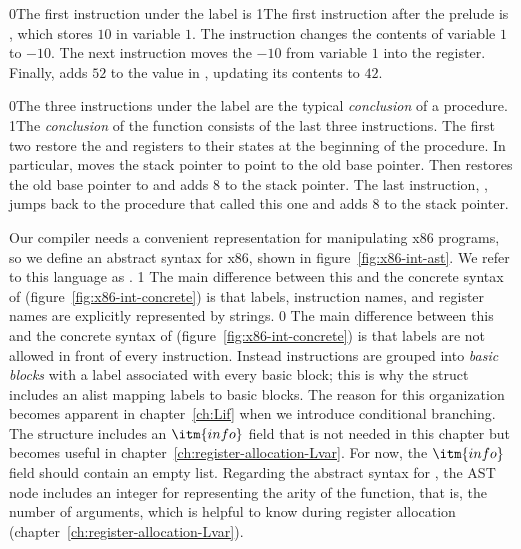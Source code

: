 \documentclass[7x10]{TimesAPriori_MIT}%
\def\racketEd{0}
\def\pythonEd{1}
\providecommand{\BookEdition}{1}
\let\edition\BookEdition
\newcommand{\racket}[1]{{\if\edition\racketEd{#1}\fi}}
\newcommand{\pythonColor}[0]{}
\newcommand{\python}[1]{{\if\edition\pythonEd\pythonColor #1\fi}}
\numberwithin{theorem}{chapter}
\numberwithin{definition}{chapter}
\numberwithin{equation}{chapter}
\begin{document}
\racket{The first instruction under the  label is}
%
\python{The first instruction after the prelude is}
%
, which stores $10$ in variable $1$.
%
The instruction  changes the contents of variable
$1$ to $-10$.
%
The next instruction moves the $-10$ from variable $1$ into the
 register.  Finally,  adds $52$ to
the value in , updating its contents to $42$.

\racket{The three instructions under the label  are the
  typical \emph{conclusion} of a procedure.}
%
\python{The \emph{conclusion}\index{subject}{conclusion} of the
  \code{main} function consists of the last three instructions.}
%
The first two restore the  and  registers to their
states at the beginning of the procedure. In particular,
 moves the stack pointer to point to the
old base pointer. Then  restores the old base pointer
to  and adds $8$ to the stack pointer.  The last instruction,
, jumps back to the procedure that called this one and adds
$8$ to the stack pointer.

Our compiler needs a convenient representation for manipulating x86
programs, so we define an abstract syntax for x86, shown in
figure~\ref{fig:x86-int-ast}. We refer to this language as
\LangXInt{}.
%
{\if\edition\pythonEd\pythonColor%
  The main difference between this and the concrete syntax of \LangXInt{}
  (figure~\ref{fig:x86-int-concrete}) is that labels, instruction
  names, and register names are explicitly represented by strings. 
\fi} %
{\if\edition\racketEd  
The main difference between this and the concrete syntax of \LangXInt{}
(figure~\ref{fig:x86-int-concrete}) is that labels are not allowed in
front of every instruction. Instead instructions are grouped into
\emph{basic blocks} with a
label associated with every basic block; this is why the 
struct includes an alist mapping labels to basic blocks. The reason for this
organization becomes apparent in chapter~\ref{ch:Lif} when we
introduce conditional branching. The  structure includes
an $\itm{info}$ field that is not needed in this chapter but becomes
useful in chapter~\ref{ch:register-allocation-Lvar}.  For now, the
$\itm{info}$ field should contain an empty list.
\fi}
%
Regarding the abstract syntax for , the  AST
node includes an integer for representing the arity of the function,
that is, the number of arguments, which is helpful to know during
register allocation (chapter~\ref{ch:register-allocation-Lvar}).
\end{document}
